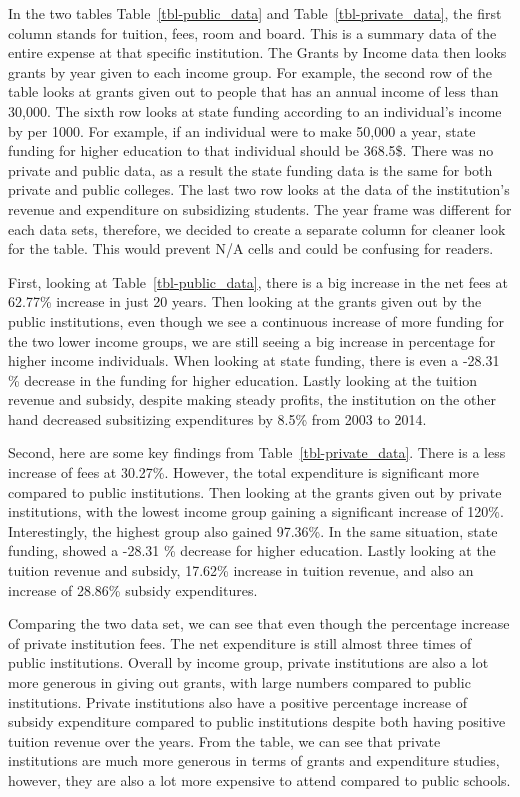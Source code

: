 \documentclass[
  letterpaper,
  DIV=11,
  numbers=noendperiod]{scrartcl}
\begin{document}
In the two tables Table~\ref{tbl-public_data} and
Table~\ref{tbl-private_data}, the first column stands for tuition, fees,
room and board. This is a summary data of the entire expense at that
specific institution. The Grants by Income data then looks grants by
year given to each income group. For example, the second row of the
table looks at grants given out to people that has an annual income of
less than 30,000. The sixth row looks at state funding according to an
individual's income by per 1000. For example, if an individual were to
make 50,000 a year, state funding for higher education to that
individual should be 368.5\$. There was no private and public data, as a
result the state funding data is the same for both private and public
colleges. The last two row looks at the data of the institution's
revenue and expenditure on subsidizing students. The year frame was
different for each data sets, therefore, we decided to create a separate
column for cleaner look for the table. This would prevent N/A cells and
could be confusing for readers.

First, looking at Table~\ref{tbl-public_data}, there is a big increase
in the net fees at 62.77\% increase in just 20 years. Then looking at
the grants given out by the public institutions, even though we see a
continuous increase of more funding for the two lower income groups, we
are still seeing a big increase in percentage for higher income
individuals. When looking at state funding, there is even a -28.31 \%
decrease in the funding for higher education. Lastly looking at the
tuition revenue and subsidy, despite making steady profits, the
institution on the other hand decreased subsitizing expenditures by
8.5\% from 2003 to 2014.

Second, here are some key findings from Table~\ref{tbl-private_data}.
There is a less increase of fees at 30.27\%. However, the total
expenditure is significant more compared to public institutions. Then
looking at the grants given out by private institutions, with the lowest
income group gaining a significant increase of 120\%. Interestingly, the
highest group also gained 97.36\%. In the same situation, state funding,
showed a -28.31 \% decrease for higher education. Lastly looking at the
tuition revenue and subsidy, 17.62\% increase in tuition revenue, and
also an increase of 28.86\% subsidy expenditures.

Comparing the two data set, we can see that even though the percentage
increase of private institution fees. The net expenditure is still
almost three times of public institutions. Overall by income group,
private institutions are also a lot more generous in giving out grants,
with large numbers compared to public institutions. Private institutions
also have a positive percentage increase of subsidy expenditure compared
to public institutions despite both having positive tuition revenue over
the years. From the table, we can see that private institutions are much
more generous in terms of grants and expenditure studies, however, they
are also a lot more expensive to attend compared to public schools.
\end{document}
